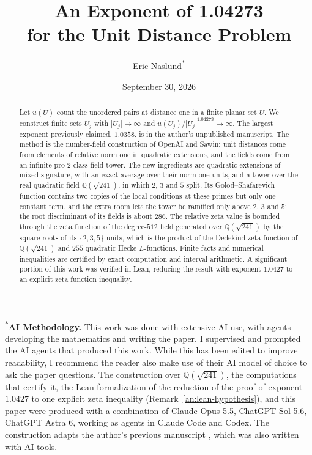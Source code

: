 \documentclass[11pt]{amsart}
\title[The Unit Distance Problem]{An Exponent of 1.04273\\for the Unit Distance Problem}
\author[Eric Naslund]{Eric Naslund\textsuperscript{*}}
\date{September 30, 2026}
\numberwithin{equation}{section}
\theoremstyle{definition}
\theoremstyle{remark}
\newcommand{\Q}{\mathbb Q}
\begin{document}
\begin{abstract}
Let $u(U)$ count the unordered pairs at distance one in a finite planar
set $U$. We construct finite sets $U_j$ with $|U_j|\to\infty$ and
$u(U_j)/|U_j|^{1.04273}\to\infty$. The largest exponent previously
claimed, $1.0358$, is in the author's unpublished manuscript. The
method is the number-field construction of OpenAI and Sawin: unit
distances come from elements of relative norm one in quadratic
extensions, and the fields come from an infinite pro-$2$ class field
tower. The new ingredients are quadratic extensions of mixed signature,
with an exact average over their norm-one units, and a tower over the
real quadratic field $\Q(\sqrt{241})$, in which $2$, $3$ and $5$ split.
Its Golod--Shafarevich function contains two copies of the local
conditions at these primes but only one constant term, and the extra room
lets the tower be ramified only above $2$, $3$ and $5$; the root
discriminant of its fields is about $286$. The relative zeta value is bounded through the zeta function of the
degree-$512$ field generated over $\Q(\sqrt{241})$ by the square roots of
its $\{2,3,5\}$-units, which is the product of the Dedekind zeta function
of $\Q(\sqrt{241})$ and $255$ quadratic Hecke $L$-functions. Finite facts and numerical
inequalities are certified by exact computation and interval arithmetic. A significant portion of this work was verified in Lean, reducing the result with exponent $1.0427$ to an explicit zeta function inequality.
\end{abstract}
\maketitle

{\noindent\small\textsuperscript{*}\textbf{AI Methodology.} This work was done with extensive AI use, with agents developing the mathematics and writing the paper. I supervised and prompted the AI agents that produced this work. While this has been edited to improve readability, I recommend the reader also make use of their AI model of choice to ask the paper questions. The
construction over $\Q(\sqrt{241})$, the computations that certify it, the
Lean formalization of the reduction of the proof of exponent $1.0427$ to one
explicit zeta inequality (Remark~\ref{an:lean-hypothesis}), and this paper
were produced with a combination of Claude Opus 5.5, ChatGPT Sol 5.6, ChatGPT Astra 6, working as agents in Claude Code and Codex. The construction adapts the author's previous manuscript
\cite{Naslund0358}, which was also written with AI tools.\par}
\medskip


\tableofcontents










\end{document}

